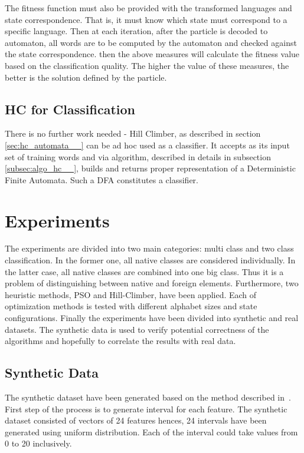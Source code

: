 \documentclass{mini}
\begin{document}
The fitness function must also be provided with the transformed languages and state correspondence. That is, it must know which state must correspond to a specific language. Then at each iteration, after the particle is decoded to automaton, all words are to be computed by the automaton and checked against the state correspondence. then the above measures will calculate the fitness value based on the classification quality. The higher the value of these measures, the better is the solution defined by the particle.

\section{HC for Classification}
There is no further work needed - Hill Climber, as described in section \ref{sec:hc_automata__} can be ad hoc used as a classifier. It accepts as its input set of training words and via algorithm, described in details in subsection \ref{subsec:algo_hc__}, builds and returns proper representation of a Deterministic Finite Automata. Such a DFA constitutes a classifier.

\chapter{Experiments}\label{chap:experiments}

The experiments are divided into two main categories: multi class and two class classification. In the former one, all native classes are considered individually. In the latter case, all native classes are combined into one big class. Thus it is a problem of distinguishing between native and foreign elements. Furthermore, two heuristic methods, PSO and Hill-Climber, have been applied. Each of optimization methods is tested with different alphabet sizes and state configurations. Finally the experiments have been divided into synthetic and real datasets. The synthetic data is used to verify potential correctness of the algorithms and hopefully to correlate the results with real data.

\section{Synthetic Data}

The synthetic dataset have been generated based on the method described in~\cite{rejector_geo}. First step of the process is to generate interval for each feature. The synthetic dataset consisted of vectors of 24 features hences, 24 intervals have been generated using uniform distribution. Each of the interval could take values from 0 to 20 inclusively. 
\end{document}
